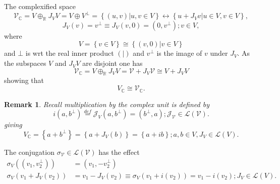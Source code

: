 \documentclass[aps,preprint]{revtex4}
\newtheorem{remark}[theorem]{Remark}
\begin{document}
The complexified space 
\begin{equation}
\mathcal{V}_{\mathbb{C}}=V\oplus _{\mathbb{R}}J_{V}V=V\oplus V^{\bot
}=\left\{ \left. \left( u,v\right) \right\vert u,v\in V\right\}
\leftrightarrow \left\{ \left. u+J_{V}v\right\vert u\in V,v\in V\right\} ,
\end{equation}%
\begin{equation}
J_{V}\left( v\right) =v^{\bot }\equiv J_{V}\left( v,0\right) =\left(
0,v^{\bot }\right) ;v\in V,
\end{equation}%
where 
\begin{equation}
V=\left\{ v\in V\right\} \cong \left\{ \left. \left( v,0\right) \right\vert
v\in V\right\}
\end{equation}%
and $\bot $ is wrt the real inner product $\left( \left. {}\right\vert
\right) $ and $v^{\bot }$ is the image of $v$ under $J_{V}.$ As the
subspaces $V$ and $J_{V}V$ are disjoint one has 
\begin{equation}
\mathcal{V}_{\mathbb{C}}=V\oplus _{\mathbb{R}}J_{V}V=\mathcal{V}+J_{V}%
\mathcal{V}\cong V+J_{V}V
\end{equation}%
showing that 
\begin{equation}
V_{\mathbb{C}}\cong \mathcal{V}_{\mathbb{C}}.
\end{equation}

\begin{remark}
Recall multiplication by the complex unit is defined by 
\begin{equation}
i\left( a,b^{\bot }\right) \overset{def}{=}\mathcal{J}_{V}\left( a,b^{\bot
}\right) =\left( b^{\bot },a\right) ;\mathcal{J}_{\mathcal{V}}\in \mathcal{L}%
\left( \mathcal{V}\right) .
\end{equation}%
giving 
\begin{equation}
V_{\mathbb{C}}=\left\{ a+b^{\bot }\right\} =\left\{ a+J_{V}\left( b\right)
\right\} =\left\{ a+ib\right\} ;a,b\in V,J_{V}\in \mathcal{L}\left( V\right)
.
\end{equation}
\end{remark}

The conjugation $\sigma _{\mathcal{V}}\in \mathcal{L}\left( \mathcal{V}%
\right) $ has the effect 
\begin{align}
\sigma _{V}\left( \left( v_{1},v_{2}^{\bot }\right) \right) & =\left(
v_{1},-v_{2}^{\bot }\right) \\
\sigma _{V}\left( v_{1}+J_{V}\left( v_{2}\right) \right) &
=v_{1}-J_{V}\left( v_{2}\right) \equiv \sigma _{V}\left( v_{1}+i\left(
v_{2}\right) \right) =v_{1}-i\left( v_{2}\right) ;J_{V}\in \mathcal{L}\left(
V\right) .
\end{align}
\end{document}
